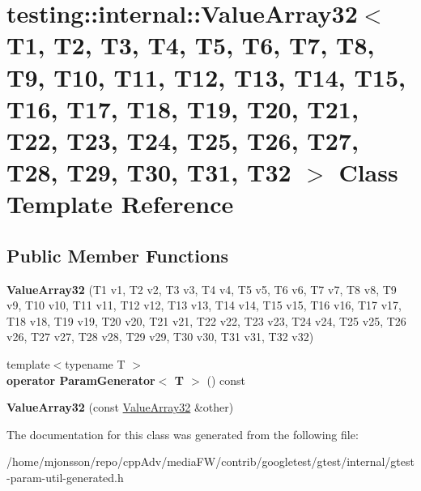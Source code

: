 \hypertarget{classtesting_1_1internal_1_1ValueArray32}{}\section{testing\+:\+:internal\+:\+:Value\+Array32$<$ T1, T2, T3, T4, T5, T6, T7, T8, T9, T10, T11, T12, T13, T14, T15, T16, T17, T18, T19, T20, T21, T22, T23, T24, T25, T26, T27, T28, T29, T30, T31, T32 $>$ Class Template Reference}
\label{classtesting_1_1internal_1_1ValueArray32}
\subsection*{Public Member Functions}
\begin{DoxyCompactItemize}
\item 
\mbox{\label{classtesting_1_1internal_1_1ValueArray32_ad5b6e2ff644e170bda8bf67ef8283c5a}} 
{\bfseries Value\+Array32} (T1 v1, T2 v2, T3 v3, T4 v4, T5 v5, T6 v6, T7 v7, T8 v8, T9 v9, T10 v10, T11 v11, T12 v12, T13 v13, T14 v14, T15 v15, T16 v16, T17 v17, T18 v18, T19 v19, T20 v20, T21 v21, T22 v22, T23 v23, T24 v24, T25 v25, T26 v26, T27 v27, T28 v28, T29 v29, T30 v30, T31 v31, T32 v32)
\item 
\mbox{\label{classtesting_1_1internal_1_1ValueArray32_a03c8932477b8fe28b2800393a23e4e13}} 
{\footnotesize template$<$typename T $>$ }\\{\bfseries operator Param\+Generator$<$ T $>$} () const
\item 
\mbox{\label{classtesting_1_1internal_1_1ValueArray32_aa64bff75279681235a4289e49ca9c2aa}} 
{\bfseries Value\+Array32} (const \hyperlink{classtesting_1_1internal_1_1ValueArray32}{Value\+Array32} \&other)
\end{DoxyCompactItemize}


The documentation for this class was generated from the following file\+:\begin{DoxyCompactItemize}
\item 
/home/mjonsson/repo/cpp\+Adv/media\+F\+W/contrib/googletest/gtest/internal/gtest-\/param-\/util-\/generated.\+h\end{DoxyCompactItemize}

